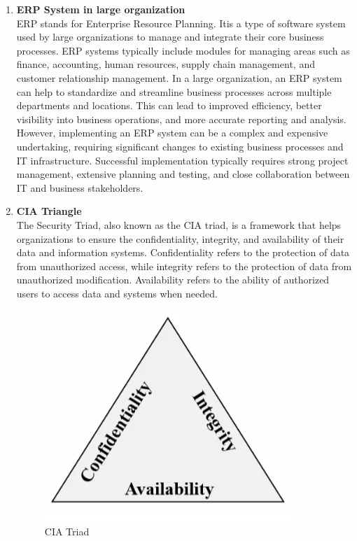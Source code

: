 \documentclass[12pt]{article}
\begin{document}
\begin{enumerate}
\begin{enumerate}
        \item {\bfseries ERP System in large organization\\}
        ERP stands for Enterprise Resource Planning. Itis a type of software system used by large organizations to manage and integrate their core business processes. ERP systems typically include modules for managing areas such as finance, accounting, human resources, supply chain management, and customer relationship management. In a large organization, an ERP system can help to standardize and streamline business processes across multiple departments and locations. This can lead to improved efficiency, better visibility into business operations, and more accurate reporting and analysis. However, implementing an ERP system can be a complex and expensive undertaking, requiring significant changes to existing business processes and IT infrastructure. Successful implementation typically requires strong project management, extensive planning and testing, and close collaboration between IT and business stakeholders.
        \item {\bfseries CIA Triangle\\}
        The Security Triad, also known as the CIA triad, is a framework that helps organizations to ensure the confidentiality, integrity, and availability of their data and information systems. Confidentiality refers to the protection of data from unauthorized access, while integrity refers to the protection of data from unauthorized modification. Availability refers to the ability of authorized users to access data and systems when needed.
    \begin{figure}[h!]
        \centering
        \includegraphics[scale = 0.5]{images/CIA.png}
        \caption{CIA Triad}
    \end{figure}

\end{enumerate}
\end{enumerate}
\end{document}
